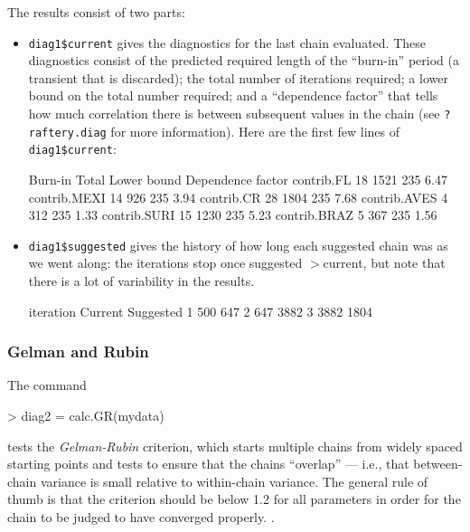 \documentclass[11pt]{article}
\begin{document}
The results consist of two parts:
\begin{itemize}
\item{\verb+diag1$current+ gives the 
diagnostics for the last chain evaluated.
These diagnostics consist of the
predicted required length of
the ``burn-in'' period (a transient that is discarded);
the total number of iterations required; a lower bound
on the total number required; and a ``dependence factor''
that tells how much correlation  there is between subsequent
values in the chain (see {\tt ?raftery.diag} for more
information).  Here are the first few lines
of \verb+diag1$current+:
\begin{Schunk}
\begin{Soutput}
             Burn-in Total Lower bound Dependence factor
contrib.FL        18  1521         235              6.47
contrib.MEXI      14   926         235              3.94
contrib.CR        28  1804         235              7.68
contrib.AVES       4   312         235              1.33
contrib.SURI      15  1230         235              5.23
contrib.BRAZ       5   367         235              1.56
\end{Soutput}
\end{Schunk}
}
\item{
\verb+diag1$suggested+ gives the history of how
long each suggested chain was as we went along:
the iterations stop once suggested $>$current,
but note that there is a lot of variability in
the results.
\begin{Schunk}
\begin{Soutput}
iteration Current Suggested
        1     500       647
        2     647      3882
        3    3882      1804
\end{Soutput}
\end{Schunk}
}
\end{itemize}


\subsubsection{Gelman and Rubin}
The command
\begin{Schunk}
\begin{Sinput}
> diag2 = calc.GR(mydata)
\end{Sinput}
\end{Schunk}
tests the \emph{Gelman-Rubin} criterion, which starts multiple
chains from widely spaced starting points and tests to ensure
that the chains ``overlap'' --- i.e., that between-chain
variance is small relative to within-chain variance. 
The general rule of thumb is that the criterion should
be below 1.2 for all parameters in order for the chain
to be judged to have converged properly.
\cite{Gelm+96}.
\end{document}
